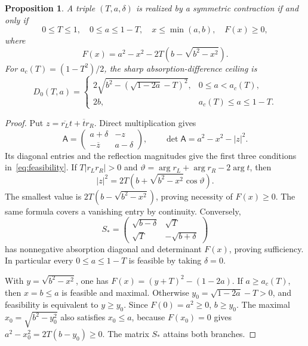 \documentclass[11pt,a4paper]{article}
\newtheorem{proposition}[theorem]{Proposition}
\theoremstyle{remark}
\newcommand{\abs}[1]{\lvert #1\rvert}
\begin{document}
\begin{proposition}\label{prop:benchmark}
A triple $(T,a,\delta)$ is realized by a symmetric contraction if and only if
\begin{equation}\label{eq:feasibility}
 0\leq T\leq1,\quad 0\leq a\leq1-T,\quad
 x\leq\min(a,b),\quad F(x)\geq0,
\end{equation}
where
\begin{equation}\label{eq:F}
 F(x)=a^2-x^2-2T\left(b-\sqrt{b^2-x^2}\right).
\end{equation}
For $a_c(T)=(1-T^2)/2$, the sharp absorption-difference ceiling is
\begin{equation}\label{eq:matrix-ceiling}
 D_0(T,a)=
 \begin{cases}
 2\sqrt{b^2-(\sqrt{1-2a}-T)^2},&0\leq a<a_c(T),\\
 2b,&a_c(T)\leq a\leq1-T.
 \end{cases}
\end{equation}
\end{proposition}
\begin{proof}
Put $z=\overline{r_L}t+\overline t r_R$. Direct multiplication gives
\[
 \mathsf A=\begin{pmatrix}a+\delta&-z\\-\overline z&a-\delta\end{pmatrix},
 \qquad \det\mathsf A=a^2-x^2-\abs z^2.
\]
Its diagonal entries and the reflection magnitudes give the first three conditions in~\eqref{eq:feasibility}. If $T\abs{r_Lr_R}>0$ and $\vartheta=\arg r_L+\arg r_R-2\arg t$, then
\[
 \abs z^2=2T\left(b+\sqrt{b^2-x^2}\cos\vartheta\right).
\]
The smallest value is $2T(b-\sqrt{b^2-x^2})$, proving necessity of $F(x)\geq0$. The same formula covers a vanishing entry by continuity. Conversely,
\[
 S_*=\begin{pmatrix}\sqrt{b-\delta}&\sqrt T\\\sqrt T&-\sqrt{b+\delta}\end{pmatrix}
\]
has nonnegative absorption diagonal and determinant $F(x)$, proving sufficiency. In particular every $0\leq a\leq1-T$ is feasible by taking $\delta=0$.

With $y=\sqrt{b^2-x^2}$, one has $F(x)=(y+T)^2-(1-2a)$. If $a\geq a_c(T)$, then $x=b\leq a$ is feasible and maximal. Otherwise $y_0=\sqrt{1-2a}-T>0$, and feasibility is equivalent to $y\geq y_0$. Since $F(0)=a^2\geq0$, $b\geq y_0$. The maximal $x_0=\sqrt{b^2-y_0^2}$ also satisfies $x_0\leq a$, because $F(x_0)=0$ gives $a^2-x_0^2=2T(b-y_0)\geq0$. The matrix $S_*$ attains both branches.
\end{proof}
\end{document}
